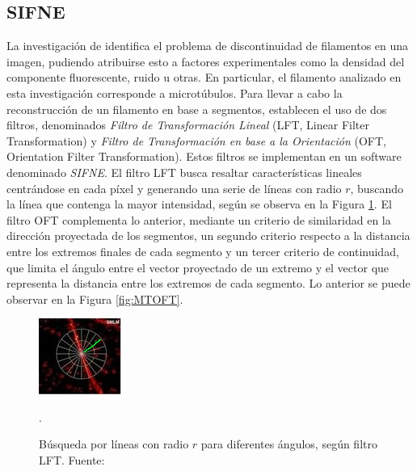 \subsection{SIFNE}
La investigaci\'on de \citet{zhang2017extracting} identifica el problema de discontinuidad de filamentos en una imagen, pudiendo atribuirse esto a factores experimentales como la densidad del componente fluorescente, ruido u otras. En particular, el filamento analizado en esta investigaci\'on corresponde a microt\'ubulos. Para llevar a cabo la reconstrucci\'on de un filamento en base a segmentos, establecen el uso de dos filtros, denominados \textit{Filtro de Transformaci\'on Lineal} (LFT, Linear Filter Transformation) y \textit{Filtro de Transformaci\'on en base a la Orientaci\'on} (OFT, Orientation Filter Transformation). Estos filtros se implementan en un software denominado {\it SIFNE}.
El filtro LFT busca resaltar caracter\'isticas lineales centr\'andose en cada p\'ixel y generando una serie de l\'ineas con radio $r$, buscando la l\'inea que contenga la mayor intensidad, seg\'un se observa en la Figura \ref{fig:MTLFT}. El filtro OFT complementa lo anterior, mediante un criterio de similaridad en la direcci\'on proyectada de los segmentos, un segundo criterio respecto a la distancia entre los extremos finales de cada segmento y un tercer criterio de continuidad, que limita el \'angulo entre el vector proyectado de un extremo y el vector que representa la distancia entre los extremos de cada segmento. Lo anterior se puede observar en la Figura \ref{fig:MTOFT}.

\begin{figure}[h]
        \centering
        \includegraphics[scale=5]{imagenes/MT-LFT.jpeg}
        \caption[B\'usqueda por l\'ineas con radio $r$ para diferentes \'angulos, según filtro LFT.]{B\'usqueda por l\'ineas con radio $r$ para diferentes \'angulos, según filtro LFT. Fuente: \cite{zhang2017extracting}}.
        \label{fig:MTLFT}
\end{figure}

